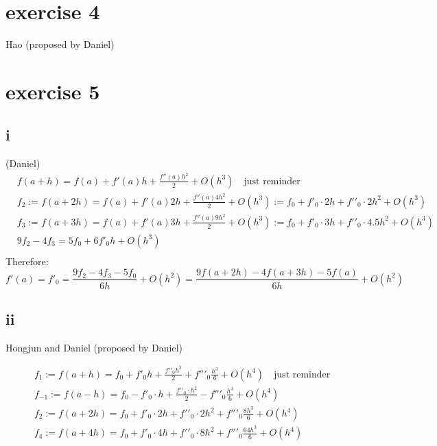 \documentclass{article}
\begin{document}
\section*{exercise 4}
Hao (proposed by Daniel)

\section*{exercise 5}
\subsection*{i}
(Daniel)
\begin{align}
     & f\left( a+h \right) = f\left( a \right)+f'\left( a \right)h+\frac{f''\left( a \right){{h}^{2}}}{2}+O\left( {{h}^{3}} \right)\quad \text{just reminder}                                                                           \\
     & {{f}_{2}}:=f\left( a+2h \right) = f\left( a \right)+f'\left( a \right)2h+\frac{f''\left( a \right)4{{h}^{2}}}{2}+O\left( {{h}^{3}} \right):={{f}_{0}}+f{{'}_{0}}\cdot 2h+f'{{'}_{0}}\cdot 2{{h}^{2}}+O\left( {{h}^{3}} \right)   \\
     & {{f}_{3}}:=f\left( a+3h \right) = f\left( a \right)+f'\left( a \right)3h+\frac{f''\left( a \right)9{{h}^{2}}}{2}+O\left( {{h}^{3}} \right):={{f}_{0}}+f{{'}_{0}}\cdot 3h+f'{{'}_{0}}\cdot 4.5{{h}^{2}}+O\left( {{h}^{3}} \right) \\
     & 9{{f}_{2}}-4{{f}_{3}}=5{{f}_{0}}+6f{{'}_{0}}h+O\left( {{h}^{3}} \right)                                                                                                                                                          \\
\end{align}
Therefore:
\[f'\left( a \right)=f{{'}_{0}}=\frac{9{{f}_{2}}-4{{f}_{3}}-5{{f}_{0}}}{6h}+O\left( {{h}^{2}} \right)=\frac{9f\left( a+2h \right)-4f\left( a+3h \right)-5f\left( a \right)}{6h}+O\left( {{h}^{2}} \right)\]
\subsection*{ii}
Hongjun and Daniel (proposed by Daniel)

\begin{align}
     & {{f}_{1}}:=f\left( a+h \right)={{f}_{0}}+f{{'}_{0}}h+\frac{f'{{'}_{0}}{{h}^{2}}}{2}+f''{{'}_{0}}\frac{{{h}^{3}}}{6}+O\left( {{h}^{4}} \right)\quad \text{just reminder} \\
     & {{f}_{-1}}:=f\left( a-h \right)={{f}_{0}}-f{{'}_{0}}\cdot h+\frac{f'{{'}_{0}}\cdot {{h}^{2}}}{2}-f''{{'}_{0}}\frac{{{h}^{3}}}{6}+O\left( {{h}^{4}} \right)              \\
     & {{f}_{2}}:=f\left( a+2h \right)={{f}_{0}}+f{{'}_{0}}\cdot 2h+f'{{'}_{0}}\cdot 2{{h}^{2}}+f''{{'}_{0}}\frac{8{{h}^{3}}}{6}+O\left( {{h}^{4}} \right)                     \\
     & {{f}_{4}}:=f\left( a+4h \right)={{f}_{0}}+f{{'}_{0}}\cdot 4h+f'{{'}_{0}}\cdot 8{{h}^{2}}+f''{{'}_{0}}\frac{64{{h}^{3}}}{6}+O\left( {{h}^{4}} \right)                    \\
\end{align}
\end{document}
